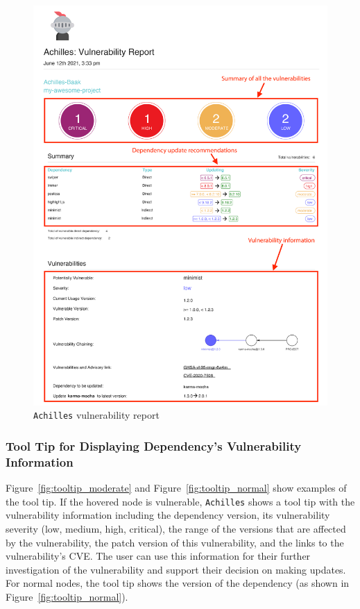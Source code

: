 \documentclass[conference]{IEEEtran}
\begin{document}
	
	\begin{figure}[tb]
		\centering
		\includegraphics[width=\columnwidth]{Figures/my-awesome-project-achilles-report-1.png}
		\caption{\texttt{Achilles} vulnerability report}
		\label{fig:vul-report-1}
	\end{figure}
	
	\subsubsection{Tool Tip for Displaying Dependency's Vulnerability Information}
	Figure~\ref{fig:tooltip_moderate} and Figure~\ref{fig:tooltip_normal} show examples of the tool tip. If the hovered node is vulnerable, \texttt{Achilles} shows a tool tip with the vulnerability information including the dependency version, its vulnerability severity (low, medium, high, critical), the range of the versions that are affected by the vulnerability, the patch version of this vulnerability, and the links to the vulnerability's CVE.
	The user can use this information for their further investigation of the vulnerability and support their decision on making updates. For normal nodes, the tool tip shows the version of the dependency (as shown in Figure~\ref{fig:tooltip_normal}).
	
\end{document}

